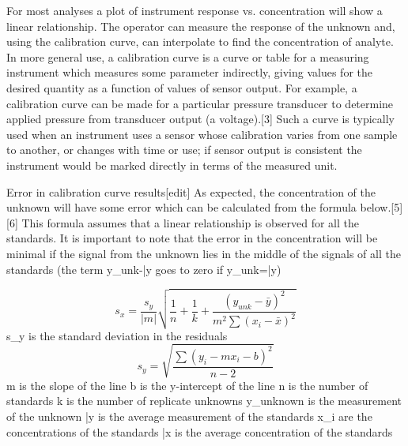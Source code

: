 For most analyses a plot of instrument response vs. concentration will show a linear relationship. The operator can measure the response of the unknown and, using the calibration curve, can interpolate to find the concentration of analyte.
In more general use, a calibration curve is a curve or table for a measuring instrument which measures some parameter indirectly, giving values for the desired quantity as a function of values of sensor output. For example, a calibration curve can be made for a particular pressure transducer to determine applied pressure from transducer output (a voltage).[3] Such a curve is typically used when an instrument uses a sensor whose calibration varies from one sample to another, or changes with time or use; if sensor output is consistent the instrument would be marked directly in terms of the measured unit.



Error in calibration curve results[edit]
As expected, the concentration of the unknown will have some error which can be calculated from the formula below.[5][6] This formula assumes that a linear relationship is observed for all the standards. It is important to note that the error in the concentration will be minimal if the signal from the unknown lies in the middle of the signals of all the standards (the term y_{unk}-\bar{y} goes to zero if y_{unk}=\bar{y})

\[s_x=\frac{s_y}{|m|}\sqrt{\frac{1}{n}+\frac{1}{k}+\frac{(y_{unk}-\bar{y})^2}{m^2\sum{(x_i-\bar{x})^2}}}\]
s_y is the standard deviation in the residuals \[ s_y =\sqrt{\frac{\sum{(y_i-mx_i-b)}^2}{n-2}}\]
m is the slope of the line
b is the y-intercept of the line
n is the number of standards
k is the number of replicate unknowns
y_{unknown} is the measurement of the unknown
\bar{y} is the average measurement of the standards
x_i are the concentrations of the standards
\bar{x} is the average concentration of the standards




